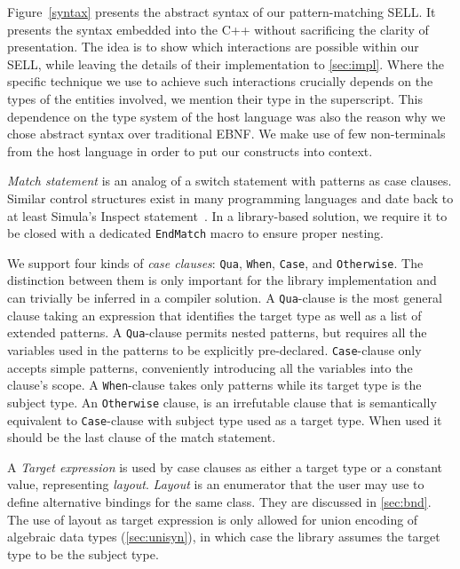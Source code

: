 \documentclass{llncs}
\makeatletter
\DeclareRobustCommand{\code}[1]{{\lstinline[keepspaces,breaklines=false,escapechar=@]{#1}}}
\makeatother
\begin{document}
Figure~\ref{syntax} presents the abstract syntax of our pattern-matching SELL. It presents 
the syntax embedded into the C++ without sacrificing 
the clarity of presentation. The idea is to show which interactions are possible 
within our SELL, while leaving the details of their implementation to 
\textsection\ref{sec:impl}. Where the specific technique we use to achieve such 
interactions crucially depends on the types of the entities involved,
we mention their type in the superscript. This dependence on the 
type system of the host language was also the reason why we chose abstract 
syntax over traditional EBNF. We make use 
of few non-terminals from the host language in order to put our constructs into 
context.

\emph{Match statement} is an analog of a switch statement with patterns as case 
clauses. Similar control structures exist in many programming languages and 
date back to at least Simula's Inspect statement~\cite{Simula67}.
In a library-based solution, we require it to be closed with a dedicated 
\code{EndMatch} macro to ensure proper nesting.

We support four kinds of \emph{case clauses}: \code{Qua}, \code{When}, 
\code{Case}, and \code{Otherwise}.
The distinction between them is only important for the library 
implementation and can trivially be inferred in a compiler solution.
A \code{Qua}-clause is the most general clause taking an  
expression that identifies the target type as well as a list of extended 
patterns.
A \code{Qua}-clause permits nested patterns, but requires all the 
variables used in the patterns to be explicitly pre-declared. \code{Case}-clause 
only accepts simple patterns, conveniently introducing all the variables into the 
clause's scope. 
A \code{When}-clause takes only patterns while its target type is 
the subject type.
An \code{Otherwise} clause, is an irrefutable clause that is 
semantically equivalent to \code{Case}-clause with subject type used as a target 
type. When used it should be the last clause of the match statement.

A \emph{Target expression} is used by case clauses as either a target type or 
a constant value, representing \emph{layout}. \emph{Layout} is an enumerator 
that the user may use to define alternative bindings for the same class. They are 
discussed in \textsection\ref{sec:bnd}. The use of layout as target 
expression is only allowed for union encoding of algebraic data types 
(\textsection\ref{sec:unisyn}), in which case the library assumes the target 
type to be the subject type.
\end{document}
